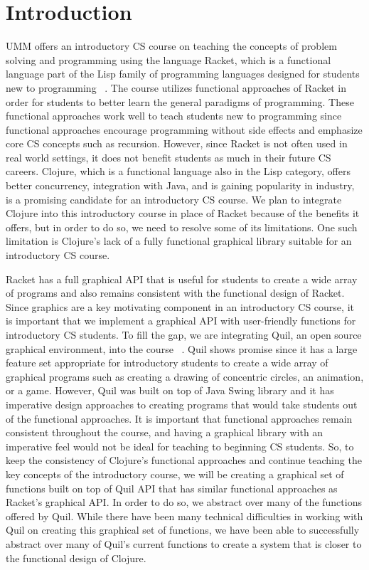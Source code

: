 \documentclass[12pt]{article}
\newcommand{\comment}[1]{{\bf \tt  {#1}}}
\newcommand{\todo}[1]{\textcolor{blue}{\comment{To Do: {#1}}}}
\begin{document}
\newpage
\setcounter{page}{1}

\section{Introduction}\label{sec:intro}
UMM offers an introductory CS course on teaching the concepts of problem solving and programming using the language Racket, which is a functional language part of the Lisp family of programming languages designed for students new to programming ~\cite{htdp}. The course utilizes functional approaches of Racket in order for students to better learn the general paradigms of programming. These functional approaches work well to teach students new to programming since functional approaches encourage programming without side effects and emphasize core CS concepts such as recursion. However, since Racket is not often used in real world settings, it does not benefit students as much in their future CS careers. Clojure, which is a functional language also in the Lisp category, offers better concurrency, integration with Java, and is gaining popularity in industry, is a promising candidate for an introductory CS course.  We plan to integrate Clojure into this introductory course in place of Racket because of the benefits it offers, but in order to do so, we need to resolve some of its limitations. One such limitation is Clojure's lack of a fully functional graphical library suitable for an introductory CS course. 

Racket has a full graphical API that is useful for students to create a wide array of programs and also remains consistent with the functional design of Racket. Since graphics are a key motivating component in an introductory CS course, it is important that we implement a graphical API with user-friendly functions for introductory CS students. To fill the gap, we are integrating Quil, an open source graphical environment, into the course ~\cite{Quil}. Quil shows promise since it has a large feature set appropriate for introductory students to create a wide array of graphical programs such as creating a drawing of concentric circles, an animation, or a game. However, Quil was built on top of Java Swing library and it has imperative design approaches to creating programs that would take students out of the functional approaches. It is important that functional approaches remain consistent throughout the course, and having a graphical library with an imperative feel would not be ideal for teaching to beginning CS students. So, to keep the consistency of Clojure's functional approaches and continue teaching the key concepts of the introductory course, we will be creating a graphical set of functions built on top of Quil API that has similar functional approaches as Racket's graphical API. In order to do so, we abstract over many of the functions offered by Quil. While there have been many technical difficulties in working with Quil on creating this graphical set of functions, we have been able to successfully abstract over many of Quil's current functions to create a system that is closer to the functional design of Clojure.
\end{document}
